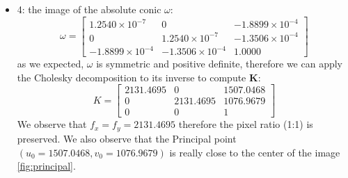 \documentclass[a4paper,11pt]{article}
\newcommand{\matr}[1]{\bm{#1}}     %
\begin{document}
\begin{itemize}
    
    From this result, we can compute $\matr{H}_B$ circularizing the conic \cite{magri2025iacv}:
    \[
        \mathbf{H_B} = 
        \begin{bmatrix}
         0.9916 & 0.0760 & 0 \\
         0.0760 & 0.3118 & 0 \\
         0      & 0      & 1
        \end{bmatrix}
    \]
    The final metric rectification is:
    \[
        H_R = H_B \cdot H_A = 
        \begin{bmatrix}
         -0.9916 & -0.0760 & 0 \\
         -0.0760 & -0.3118 & 0 \\
         -0.0012 & -0.0003 & 1
        \end{bmatrix}
    \]
    \item 4: the image of the absolute conic $\omega$:
     \[
       \omega  =
\begin{bmatrix}
1.2540 \times 10^{-7} & 0 & -1.8899 \times 10^{-4} \\
0 & 1.2540 \times 10^{-7} & -1.3506 \times 10^{-4} \\
-1.8899 \times 10^{-4} & -1.3506 \times 10^{-4} & 1.0000
\end{bmatrix}
    \]
    as we expected, $\omega$ is symmetric and positive definite, therefore we can apply the Cholesky decomposition to its inverse to compute $\mathbf{K}$:
    \[
    K =
        \begin{bmatrix}
        2131.4695 & 0 & 1507.0468 \\
        0 & 2131.4695 & 1076.9679 \\
        0 & 0 & 1
        \end{bmatrix}
        \]
    We observe that $f_x = f_y = 2131.4695$ therefore the pixel ratio (1:1) is preserved. We  also observe that the Principal point $(u_0 = 1507.0468, v_0 = 1076.9679 )$ is really close to the center of the image \ref{fig:principal}.
    

\end{itemize}
\end{document}
